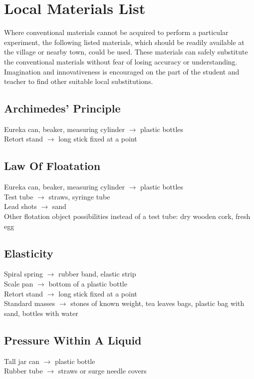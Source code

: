 \chapter{Local Materials List}

Where conventional materials cannot be acquired to perform a particular experiment, the following listed materials, which should be readily available at the village or nearby town, could be used. These materials can safely substitute the conventional materials without fear of losing accuracy or understanding. Imagination and innovativeness is encouraged on the part of the student and teacher to find other suitable local substitutions.  

\section{Archimedes' Principle}
Eureka can, beaker, measuring cylinder $\rightarrow$ plastic bottles\\
Retort stand $\rightarrow$ long stick fixed at a point

\section{Law Of Floatation}
Eureka can, beaker, measuring cylinder $\rightarrow$ plastic bottles\\
Test tube $\rightarrow$ straws, syringe tube\\
Lead shots $\rightarrow$ sand \\
Other flotation object possibilities instead of a test tube: dry wooden cork, fresh egg

\section{Elasticity}
Spiral spring $\rightarrow$ rubber band, elastic strip\\
Scale pan $\rightarrow$ bottom of a plastic bottle\\
Retort stand $\rightarrow$ long stick fixed at a point\\
Standard masses $\rightarrow$ stones of known weight, tea leaves bags, plastic bag with sand, bottles with water

\section{Pressure Within A Liquid}
Tall jar can $\rightarrow$ plastic bottle\\
Rubber tube $\rightarrow$ straws or surge needle covers

